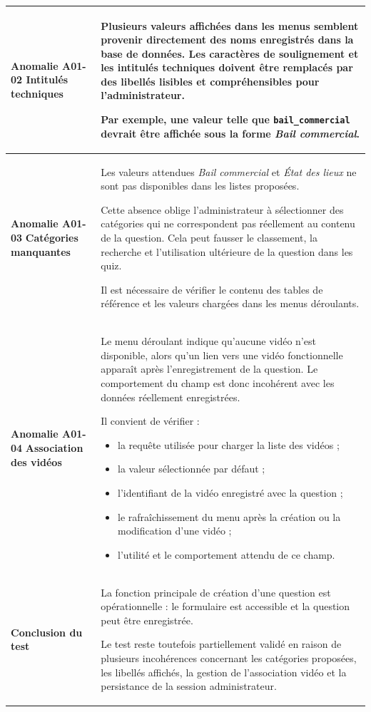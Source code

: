 \begin{longtable}{
    |>{\raggedright\arraybackslash}p{}
    |>{\raggedright\arraybackslash}p{}|
}
\textbf{Anomalie A01-02}\newline
\textbf{Intitulés techniques}
&
Plusieurs valeurs affichées dans les menus semblent provenir directement
des noms enregistrés dans la base de données.
Les caractères de soulignement et les intitulés techniques doivent être
remplacés par des libellés lisibles et compréhensibles pour
l'administrateur.

Par exemple, une valeur telle que
\texttt{bail\_commercial} devrait être affichée sous la forme
\textit{Bail commercial}.
\\
\hline

\textbf{Anomalie A01-03}\newline
\textbf{Catégories manquantes}
&
Les valeurs attendues \textit{Bail commercial} et
\textit{État des lieux} ne sont pas disponibles dans les listes proposées.

Cette absence oblige l'administrateur à sélectionner des catégories qui ne
correspondent pas réellement au contenu de la question. Cela peut fausser
le classement, la recherche et l'utilisation ultérieure de la question
dans les quiz.

Il est nécessaire de vérifier le contenu des tables de référence et les
valeurs chargées dans les menus déroulants.
\\
\hline

\textbf{Anomalie A01-04}\newline
\textbf{Association des vidéos}
&
Le menu déroulant indique qu'aucune vidéo n'est disponible, alors qu'un lien
vers une vidéo fonctionnelle apparaît après l'enregistrement de la question.
Le comportement du champ est donc incohérent avec les données réellement
enregistrées.

Il convient de vérifier :
\begin{itemize}[leftmargin=*,nosep]
    \item la requête utilisée pour charger la liste des vidéos ;
    \item la valeur sélectionnée par défaut ;
    \item l'identifiant de la vidéo enregistré avec la question ;
    \item le rafraîchissement du menu après la création ou la modification
    d'une vidéo ;
    \item l'utilité et le comportement attendu de ce champ.
\end{itemize}
\\
\hline

\textbf{Conclusion du test}
&
La fonction principale de création d'une question est opérationnelle :
le formulaire est accessible et la question peut être enregistrée.

Le test reste toutefois partiellement validé en raison de plusieurs
incohérences concernant les catégories proposées, les libellés affichés,
la gestion de l'association vidéo et la persistance de la session
administrateur.
\\
\hline

\end{longtable}



